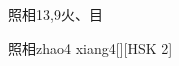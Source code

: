 \begin{entry}{照相}{13,9}{⽕、⽬}
  \begin{phonetics}{照相}{zhao4 xiang4}[][HSK 2]
  \end{phonetics}
\end{entry}

